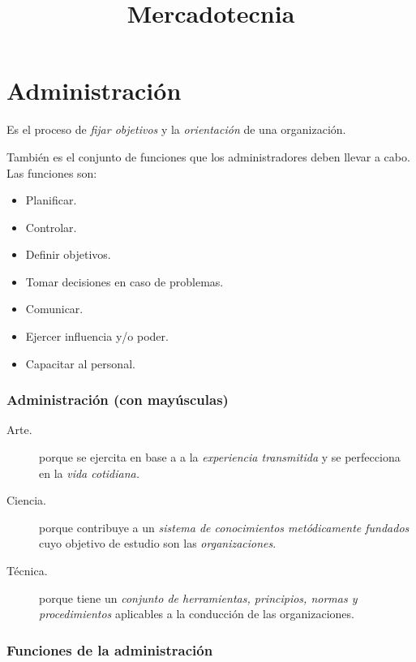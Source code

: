 \documentclass[12pt, spanish, a5paper]{article}
\begin{document}
\title{\textbf{Mercadotecnia}}
\date{}

\maketitle



{\footnotesize \tableofcontents}

\bigskip
\listoffigures



\newpage



\part{Administración}
Es el proceso de \emph{fijar objetivos} y la \emph{orientación} de una organización.

También es el conjunto de funciones que los administradores deben llevar a cabo. Las funciones son:
\begin{itemize}
	\item Planificar.
	\item Controlar.
	\item Definir objetivos.
	\item Tomar decisiones en caso de problemas.
	\item Comunicar.
	\item Ejercer influencia y/o poder.
	\item Capacitar al personal.
\end{itemize}

\section{Administración (con mayúsculas)}
\begin{description}
	\item[Arte.]	porque se ejercita en base a a la \emph{experiencia transmitida} y  se perfecciona en la \emph{vida cotidiana.}
\item[Ciencia.] porque contribuye a un \emph{sistema de conocimientos metódicamente fundados} cuyo objetivo de estudio son las \emph{organizaciones}.
\item[Técnica.] porque tiene un \emph{conjunto de herramientas, principios, normas y procedimientos} aplicables a la conducción de las organizaciones.
\end{description}

\section{Funciones de la administración}
\end{document}
